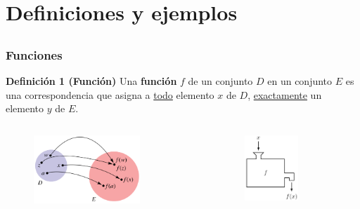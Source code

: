 \section{Definiciones y ejemplos}

\subsection{}

{\nologo
\begin{frame}\frametitle{Funciones}

\vspace{-3mm}

\begin{block}{\textbf{Definición 1 (Función)}}
	\justifying
	Una \textbf{función} $f$ de un conjunto $D$ en un conjunto $E$ es una correspondencia que asigna a \underline{todo} elemento $x$ de $D$, 
	\underline{exactamente} un elemento $y$ de $E$.
	
	\vspace{-5mm}
	
	\begin{columns}
		\hspace{5mm}
		\begin{column}{0.5\textwidth}
			\begin{figure}[H]
				\centering
				\includegraphics[width=4cm]{imagenes/funcion1}
			\end{figure}   
		\end{column}
		\begin{column}{0.4\textwidth}  %
			\begin{figure}[H]
				\centering
				\includegraphics[width=2cm]{imagenes/funcion2}
			\end{figure}   
		\end{column}
	\end{columns}
	

\end{block}
\end{frame}}
